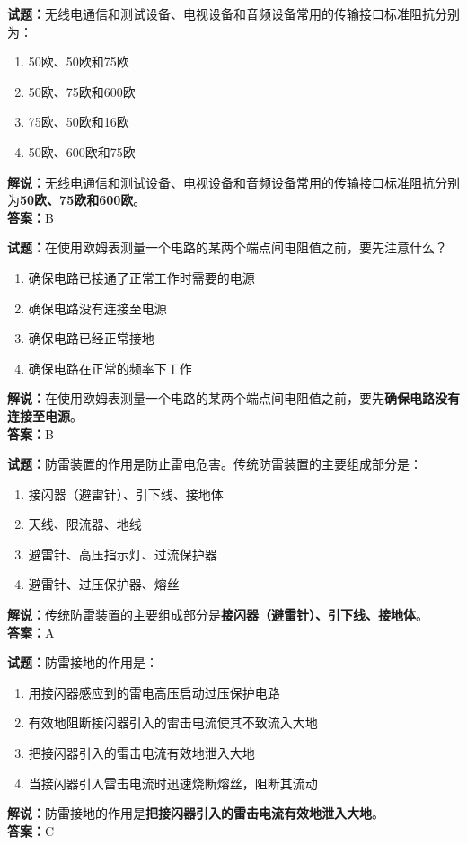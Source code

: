 \documentclass{ctexbook}
\begin{document}
\vspace{1em}

\textbf{试题：}无线电通信和测试设备、电视设备和音频设备常用的传输接口标准阻抗分别为：
\begin{enumerate}[leftmargin=3em]
  \item 50欧、50欧和75欧
  \item 50欧、75欧和600欧
  \item 75欧、50欧和16欧
  \item 50欧、600欧和75欧
\end{enumerate}
\noindent\textbf{解说：}无线电通信和测试设备、电视设备和音频设备常用的传输接口标准阻抗分别为\textbf{50欧、75欧和600欧}。\\\noindent\textbf{答案：}B

\vspace{1em}

\textbf{试题：}在使用欧姆表测量一个电路的某两个端点间电阻值之前，要先注意什么？
\begin{enumerate}[leftmargin=3em]
  \item 确保电路已接通了正常工作时需要的电源
  \item 确保电路没有连接至电源
  \item 确保电路已经正常接地
  \item 确保电路在正常的频率下工作
\end{enumerate}
\noindent\textbf{解说：}在使用欧姆表测量一个电路的某两个端点间电阻值之前，要先\textbf{确保电路没有连接至电源}。\\\noindent\textbf{答案：}B

\vspace{1em}

\textbf{试题：}防雷装置的作用是防止雷电危害。传统防雷装置的主要组成部分是：
\begin{enumerate}[leftmargin=3em]
  \item 接闪器（避雷针）、引下线、接地体
  \item 天线、限流器、地线
  \item 避雷针、高压指示灯、过流保护器
  \item 避雷针、过压保护器、熔丝
\end{enumerate}
\noindent\textbf{解说：}传统防雷装置的主要组成部分是\textbf{接闪器（避雷针）、引下线、接地体}。\\\noindent\textbf{答案：}A

\vspace{1em}

\textbf{试题：}防雷接地的作用是：
\begin{enumerate}[leftmargin=3em]
  \item 用接闪器感应到的雷电高压启动过压保护电路
  \item 有效地阻断接闪器引入的雷击电流使其不致流入大地
  \item 把接闪器引入的雷击电流有效地泄入大地
  \item 当接闪器引入雷击电流时迅速烧断熔丝，阻断其流动
\end{enumerate}
\noindent\textbf{解说：}防雷接地的作用是\textbf{把接闪器引入的雷击电流有效地泄入大地}。\\\noindent\textbf{答案：}C
\end{document}
